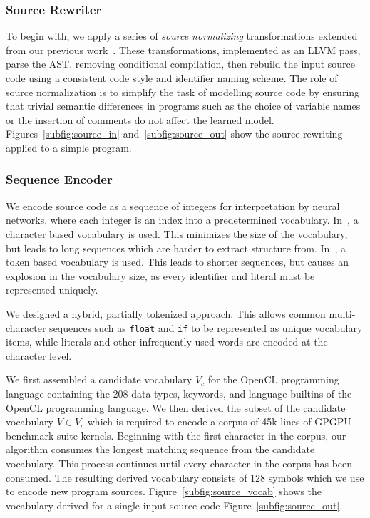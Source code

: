 \subsubsection{Source Rewriter} To begin with, we apply a series of \emph{source normalizing} transformations extended from our previous work~\cite{Cummins2017a}. These transformations, implemented as an LLVM pass, parse the AST, removing conditional compilation, then rebuild the input source code using a consistent code style and identifier naming scheme. The role of source normalization is to simplify the task of modelling source code by ensuring that trivial semantic differences in programs such as the choice of variable names or the insertion of comments do not affect the learned model. Figures~\ref{subfig:source_in} and~\ref{subfig:source_out} show the source rewriting applied to a simple program.

\subsubsection{Sequence Encoder}  We encode source code as a sequence of integers for interpretation by neural networks, where each integer is an index into a predetermined vocabulary. In~\cite{Cummins2017a}, a character based vocabulary is used. This minimizes the size of the vocabulary, but leads to long sequences which are harder to extract structure from. In~\cite{Allamanis2013a}, a token based vocabulary is used. This leads to shorter sequences, but causes an explosion in the vocabulary size, as every identifier and literal must be represented uniquely.

We designed a hybrid, partially tokenized approach. This allows common multi-character sequences such as \texttt{float} and \texttt{if} to be represented as unique vocabulary items, while literals and other infrequently used words are encoded at the character level.

We first assembled a candidate vocabulary $V_c$ for the OpenCL programming language containing the 208 data types, keywords, and language builtins of the OpenCL programming language. We then derived the subset of the candidate vocabulary $V \in V_c$ which is required to encode a corpus of 45k lines of GPGPU benchmark suite kernels. Beginning with the first character in the corpus, our algorithm consumes the longest matching sequence from the candidate vocabulary. This process continues until every character in the corpus has been consumed. The resulting derived vocabulary consists of 128 symbols which we use to encode new program sources. Figure~\ref{subfig:source_vocab} shows the vocabulary derived for a single input source code Figure~\ref{subfig:source_out}.

